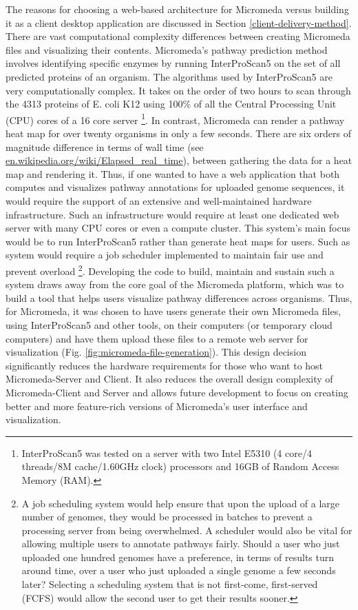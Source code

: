 The reasons for choosing a web-based architecture for Micromeda versus building it as a client desktop application are discussed in Section \ref{client-delivery-method}. There are vast computational complexity differences between creating Micromeda files and visualizing their contents. Micromeda's pathway prediction method involves identifying specific enzymes by running InterProScan5 on the set of all predicted proteins of an organism. The algorithms used by InterProScan5 are very computationally complex. It takes on the order of two hours to scan through the 4313 proteins of E. coli K12 using 100\% of all the Central Processing Unit (CPU) cores of a 16 core server \footnote{InterProScan5 was tested on a server with two Intel E5310 (4 core/4 threads/8M cache/1.60GHz clock) processors and 16GB of Random Access Memory (RAM).}. In contrast, Micromeda can render a pathway heat map for over twenty organisms in only a few seconds. There are six orders of magnitude difference in terms of wall time (see \href{en.wikipedia.org/wiki/Elapsed\_real\_time}{en.wikipedia.org/wiki/Elapsed\_real\_time}), between gathering the data for a heat map and rendering it. Thus, if one wanted to have a web application that both computes and visualizes pathway annotations for uploaded genome sequences, it would require the support of an extensive and well-maintained hardware infrastructure. Such an infrastructure would require at least one dedicated web server with many CPU cores or even a compute cluster. This system's main focus would be to run InterProScan5 rather than generate heat maps for users. Such as system would require a job scheduler implemented to maintain fair use and prevent overload \footnote{A job scheduling system would help ensure that upon the upload of a large number of genomes, they would be processed in batches to prevent a processing server from being overwhelmed. A scheduler would also be vital for allowing multiple users to annotate pathways fairly. Should a user who just uploaded one hundred genomes have a preference, in terms of results turn around time, over a user who just uploaded a single genome a few seconds later? Selecting a scheduling system that is not first-come, first-served (FCFS) would allow the second user to get their results sooner.}. Developing the code to build, maintain and sustain such a system draws away from the core goal of the Micromeda platform, which was to build a tool that helps users visualize pathway differences across organisms. Thus, for Micromeda, it was chosen to have users generate their own Micromeda files, using InterProScan5 and other tools, on their computers (or temporary cloud computers) and have them upload these files to a remote web server for visualization (Fig. \ref{fig:micromeda-file-generation}). This design decision significantly reduces the hardware requirements for those who want to host Micromeda-Server and Client. It also reduces the overall design complexity of Micromeda-Client and Server and allows future development to focus on creating better and more feature-rich versions of Micromeda's user interface and visualization.

